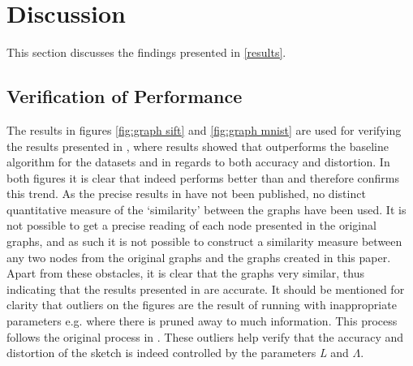 \section{Discussion}
\label{discussion}
This section discusses the findings presented in \ref{results}.

\subsection{Verification of Performance}
The results in figures \ref{fig:graph sift} and \ref{fig:graph mnist} are used for verifying the results presented in \cite{wagner17}, where results showed that \qs{} outperforms the baseline \grid{} algorithm for the datasets \sift{} and \mnist{} in regards to both accuracy and distortion. In both figures it is clear that \qs{} indeed performs better than \grid{} and therefore confirms this trend. As the precise results in \cite{wagner17} have not been published, no distinct quantitative measure of the ‘similarity’ between the graphs have been used. It is not possible to get a precise reading of each node presented in the original graphs, and as such it is not possible to construct a similarity measure between any two nodes from the original graphs and the graphs created in this paper. 
\\
Apart from these obstacles, it is clear that the graphs very similar, thus indicating that the results presented in \cite{wagner17} are accurate. It should be mentioned for clarity that outliers on the figures are the result of running \qs{} with inappropriate parameters e.g. where there is pruned away to much information. This process follows the original process in \cite{wagner17}. These outliers help verify that the accuracy and distortion of the sketch is indeed controlled by the parameters \textit{L} and $\Lambda$.  

